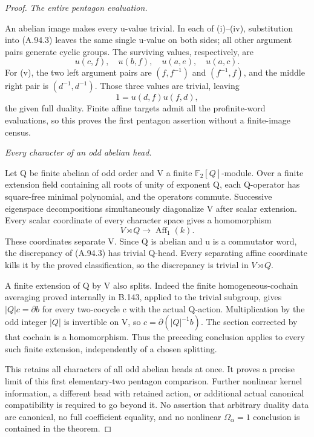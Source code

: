\begin{proof}
\emph{The entire pentagon evaluation.}\par
An abelian image makes every u-value trivial. In each of
(i)--(iv), substitution into (A.94.3) leaves the same single
u-value on both sides; all other argument pairs generate
cyclic groups. The surviving values, respectively, are
\[
                    u(c,f),\quad u(b,f),\quad
                    u(a,e),\quad u(a,c).
\]
For (v), the two left argument pairs are \((f,f^{-1})\)
and \((f^{-1},f)\), and the middle right pair is
\((d^{-1},d^{-1})\). Those three values are trivial,
leaving
\[
                            1=u(d,f)u(f,d),
\]
the given full duality. Finite affine targets admit all
the profinite-word evaluations, so this proves the first
pentagon assertion without a finite-image census.

\emph{Every character of an odd abelian head.}\par
Let Q be finite abelian of odd order and V a finite
\(\mathbb F_2[Q]\)-module. Over a finite extension field
containing all roots of unity of exponent Q, each Q-operator
has square-free minimal polynomial, and the operators commute.
Successive eigenspace decompositions simultaneously diagonalize
V after scalar extension. Every scalar coordinate of every
character space gives a homomorphism
\[
                         V\rtimes Q\longrightarrow
                                      \operatorname{Aff}_1(k).
\]
These coordinates separate V. Since Q is abelian and u is
a commutator word, the discrepancy of (A.94.3) has trivial
Q-head. Every separating affine coordinate kills it by the
proved classification, so the discrepancy is trivial in
\(V\rtimes Q\).

A finite extension of Q by V also splits. Indeed the finite
homogeneous-cochain averaging proved internally in B.143,
applied to the trivial subgroup, gives \(|Q|c=\partial b\)
for every two-cocycle c with the actual Q-action. Multiplication
by the odd integer \(|Q|\) is invertible on V, so
\(c=\partial(|Q|^{-1}b)\). The section corrected by that
cochain is a homomorphism. Thus the preceding conclusion
applies to every such finite extension, independently of a
chosen splitting.

This retains all characters of all odd abelian heads at once.
It proves a precise limit of this first elementary-two pentagon
comparison. Further nonlinear kernel information, a different
head with retained action, or additional actual canonical
compatibility is required to go beyond it. No assertion that
arbitrary duality data are canonical, no full coefficient
equality, and no nonlinear \(\Omega_\alpha=1\) conclusion
is contained in the theorem.
\end{proof}
